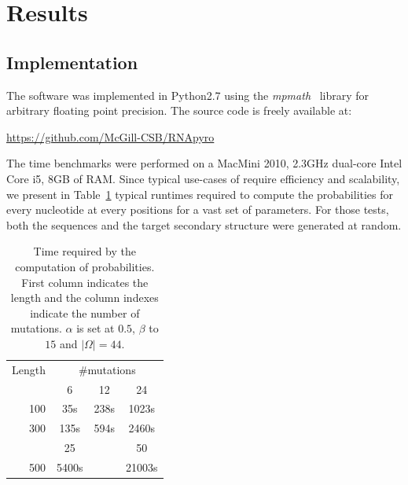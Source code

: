 \section{Results}
\label{sec:results}

\subsection{Implementation}
The software was implemented in Python2.7 using the \textit{mpmath}~\cite{mpmath} library
for  arbitrary floating point precision. The source code is freely available at:

{\centering \url{https://github.com/McGill-CSB/RNApyro}\\}

The time benchmarks were performed on a MacMini 2010, 2.3GHz dual-core Intel Core i5, 8GB of RAM.
Since typical use-cases of \RNApyro require
 efficiency and scalability, we present in Table~\ref{tab:time} typical runtimes required to compute the probabilities for  every nucleotide at every positions for a vast set of parameters. For those tests,
 both the sequences and the target secondary structure were generated at random.


\begin{table}[t]
\begin{minipage}{.4\textwidth}
\begin{tabular}{rccc}
Length &\multicolumn{3}{c}{\#mutations}\\\cline{2-4}
		 			  & 6   &  12  & 24\\\cline{2-4}
100  				& 35s  & 238s & 1023s\\
300  			& 135s & 594s &2460s\\\cline{2-4}
		 						& 25   &    &	50		\\\cline{2-4}
500         & 5400s&       &  21003s    \\
\end{tabular}
\end{minipage}
\begin{minipage}{.59\textwidth}
\caption{Time required by the computation of probabilities. First column indicates the length and  the column indexes indicate the number
 of mutations. $\alpha$ is
set at $0.5$,  $\beta$ to $15$ and $|\Omega|=44$.}
\label{tab:time}
\end{minipage}
\SpaceCheating
\end{table}


